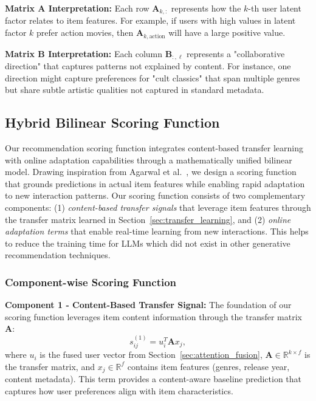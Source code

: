 \documentclass[acmsmall]{acmart}
\begin{document}
\textbf{Matrix A Interpretation:} Each row $\mathbf{A}_{k,:}$ represents how the $k$-th user latent factor relates to item features. For example, if users with high values in latent factor $k$ prefer action movies, then $\mathbf{A}_{k,\text{action}}$ will have a large positive value.

\textbf{Matrix B Interpretation:} Each column $\mathbf{B}_{:,\ell}$ represents a "collaborative direction" that captures patterns not explained by content. For instance, one direction might capture preferences for "cult classics" that span multiple genres but share subtle artistic qualities not captured in standard metadata.

\subsection{Hybrid Bilinear Scoring Function}
\label{sec:bilinear_scoring}

Our recommendation scoring function integrates content-based transfer learning with online adaptation capabilities through a mathematically unified bilinear model. Drawing inspiration from Agarwal et al.~\cite{agarwal2010fast}, we design a scoring function that grounds predictions in actual item features while enabling rapid adaptation to new interaction patterns.
 Our scoring function consists of two complementary components: (1) \textit{content-based transfer signals} that leverage item features through the transfer matrix learned in Section~\ref{sec:transfer_learning}, and (2) \textit{online adaptation terms} that enable real-time learning from new interactions. This helps to reduce the training time for LLMs which did not exist in other generative recommendation techniques.

\subsubsection{Component-wise Scoring Function}

\textbf{Component 1 - Content-Based Transfer Signal:} The foundation of our scoring function leverages item content information through the transfer matrix $\mathbf{A}$:
\begin{equation}
s^{(1)}_{ij} = u_i^T \mathbf{A} x_j,
\label{eq:transfer_component}
\end{equation}
where $u_i$ is the fused user vector from Section~\ref{sec:attention_fusion}, $\mathbf{A} \in \mathbb{R}^{k \times f}$ is the transfer matrix, and $x_j \in \mathbb{R}^f$ contains item features (genres, release year, content metadata). This term provides a content-aware baseline prediction that captures how user preferences align with item characteristics.
\end{document}
